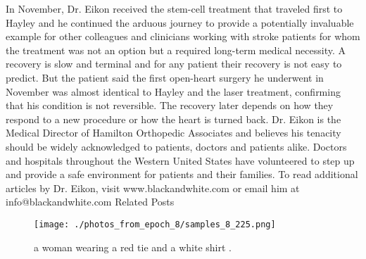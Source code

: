 \documentclass{article}%
\begin{document}
In November, Dr. Eikon received the stem{-}cell treatment that traveled first to Hayley and he continued the arduous journey to provide a potentially invaluable example for other colleagues and clinicians working with stroke patients for whom the treatment was not an option but a required long{-}term medical necessity.\newline%
A recovery is slow and terminal and for any patient their recovery is not easy to predict. But the patient said the first open{-}heart surgery he underwent in November was almost identical to Hayley and the laser treatment, confirming that his condition is not reversible. The recovery later depends on how they respond to a new procedure or how the heart is turned back.\newline%
Dr. Eikon is the Medical Director of Hamilton Orthopedic Associates and believes his tenacity should be widely acknowledged to patients, doctors and patients alike. Doctors and hospitals throughout the Western United States have volunteered to step up and provide a safe environment for patients and their families.\newline%
To read additional articles by Dr. Eikon, visit www.blackandwhite.com or email him at info@blackandwhite.com\newline%
Related Posts\newline%

%


\begin{figure}[h!]%
\centering%
\texttt{[image: ./photos\_from\_epoch\_8/samples\_8\_225.png]}%
\caption{a woman wearing a red tie and a white shirt .}%
\end{figure}

%
\end{document}
